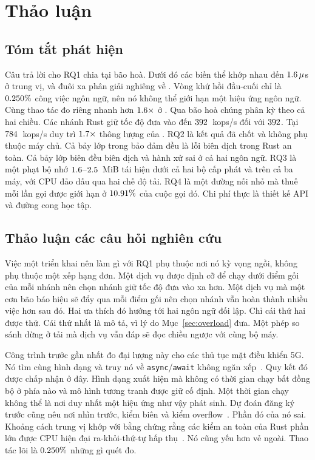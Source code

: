 \chapter{Thảo luận\label{chapter:discussion}}

\section{Tóm tắt phát hiện}
Câu trả lời cho RQ1 chia tại bão hoà. Dưới đó các biến thể khớp nhau đến $1.6\,\mu$s ở
trung vị, và đuôi xa phân giải nghiêng về \FarTailLower{}. Vòng khứ hồi đầu-cuối chỉ là
$0.250\%$ công việc ngôn ngữ, nên nó không thể giới hạn một hiệu ứng ngôn ngữ.
Cùng thao tác đo riêng nhanh hơn $1.6\times$ ở \BudgetCoreFaster{}. Qua bão hoà
chúng phân kỳ theo cả hai chiều. Các nhánh Rust giữ tốc độ đưa vào đến $392$~kops/s
đối với $392$. Tại $784$~kops/s \OverloadSustainedFaster{} duy trì
$1.7\times$ thông lượng của \OverloadSustainedSlower{}.
RQ2 là kết quả đã chốt và không phụ thuộc máy chủ. Cả bảy lớp trong bảo đảm đều là lỗi biên dịch
trong Rust an toàn. Cả bảy lớp biên đều biên dịch và hành xử sai ở cả hai ngôn ngữ. RQ3 là một
phạt bộ nhớ $1.6$--$2.5$~MiB tái hiện dưới cả hai bộ cấp phát và trên cả
ba máy, với CPU đảo dấu qua hai chế độ tải. RQ4 là một đường nối nhỏ mà thuế mỗi lần gọi được
giới hạn ở $10.91\%$ của cuộc gọi đó. Chi phí thực là thiết kế API và đường cong học
tập.

\section{Thảo luận các câu hỏi nghiên cứu}\label{sec:rqdiscussion}
Việc một triển khai nên làm gì với RQ1 phụ thuộc nơi nó kỳ vọng ngồi, không phụ thuộc một xếp
hạng đơn. Một dịch vụ được định cỡ để chạy dưới điểm gối của mỗi nhánh nên chọn nhánh giữ tốc độ
đưa vào xa hơn. Một dịch vụ mà một cơn bão báo hiệu sẽ đẩy qua mỗi điểm gối nên chọn nhánh vẫn hoàn
thành nhiều việc hơn sau đó. Hai ưa thích đó hướng tới hai ngôn ngữ đối lập. Chỉ cái thứ hai
được thử. Cái thứ nhất là mô tả, vì lý do Mục~\ref{sec:overload} đưa. Một phép so sánh dừng ở
tải mà dịch vụ vẫn đáp sẽ đọc chiều ngược với cùng bộ máy.

Công trình trước gần nhất đo đại lượng này cho các thủ tục mặt điều khiển 5G. Nó tìm cùng hình
dạng và truy nó về \texttt{async}/\texttt{await} không ngăn xếp~\cite{arvidsson2025async}. Quy
kết đó được chấp nhận ở đây. Hình dạng xuất hiện mà không có thời gian chạy bất đồng bộ ở phía
nào và mô hình tương tranh được giữ cố định. Một thời gian chạy không thể là nơi duy nhất một
hiệu ứng như vậy phát sinh. Dự đoán đăng ký trước cũng nêu nơi nhìn trước, kiểm biên và kiểm
overflow~\cite{zhang2022runtime,harris2023morello}. Phần đó của nó sai. Khoảng cách trung vị
khớp với bằng chứng rằng các kiểm an toàn của Rust phần lớn được CPU hiện đại ra-khỏi-thứ-tự
hấp thụ~\cite{balasubramanian2017rust,emmerich2019drivers}. Nó cũng yếu hơn vẻ ngoài. Thao tác
lõi là $0.250\%$ những gì quét đo.

